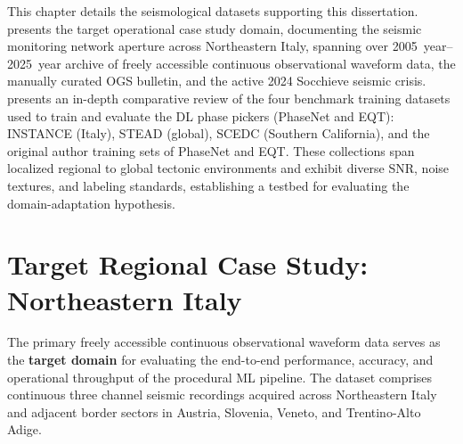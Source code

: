 
\label{chap:datasets}

This chapter details the seismological datasets supporting this dissertation.
 presents the target operational case study domain,
documenting the seismic monitoring network aperture across Northeastern Italy,
spanning over \qtyrange{2005}{2025}{year} archive of freely accessible
continuous observational waveform data, the manually curated \ac{OGS} bulletin,
and the active 2024 Socchieve seismic crisis. 
presents an in-depth comparative review of the four benchmark training datasets
used to train and evaluate the \ac{DL} phase pickers (\ac{PhaseNet} and
\ac{EQT}): \ac{INSTANCE} (Italy), \ac{STEAD} (global), \ac{SCEDC} (Southern
California), and the original author training sets of \ac{PhaseNet} and
\ac{EQT}. These collections span localized regional to global tectonic
environments and exhibit diverse \ac{SNR}, noise textures, and labeling
standards, establishing a testbed for evaluating the domain-adaptation
hypothesis.

\section{Target Regional Case Study: Northeastern Italy}
\label{sec:case_study}

The primary freely accessible continuous observational waveform data serves as
the \textbf{target domain} for evaluating the end-to-end performance, accuracy,
and operational throughput of the procedural \ac{ML} pipeline. The dataset
comprises continuous three channel seismic recordings acquired across
Northeastern Italy and adjacent border sectors in Austria, Slovenia, Veneto,
and Trentino-Alto Adige.

